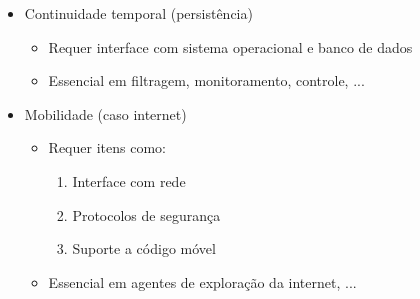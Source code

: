 \begin{frame} [allowframebreaks=0.9]
\begin{itemize}
    \begin{itemize}
      \item IA + modelagem de atitudes e emoções (computação afetiva)
      \item Essencial em entretenimento digital, realidade virtual, interfaces amigáveis ... 
    \end{itemize}
    
    \item Continuidade temporal (persistência)
    \begin{itemize}
      \item Requer interface com sistema operacional e banco de dados
    \item Essencial em filtragem, monitoramento, controle, ...
    \end{itemize}
    
    
 \item Mobilidade (caso internet)
  \begin{itemize}
     \item Requer itens como:
     \begin{enumerate}
       \item Interface com rede
       \item Protocolos de segurança
       \item Suporte a código móvel
     \end{enumerate}

    \item Essencial em agentes de exploração da internet, ...
         
     \end{itemize}      
                  
    \end{itemize}
 
\end{frame}

